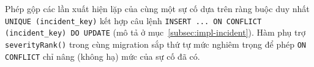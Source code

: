 Phép gộp các lần xuất hiện lặp của cùng một sự cố dựa trên ràng buộc duy nhất
\texttt{UNIQUE (incident\_key)} kết hợp câu lệnh \texttt{INSERT ... ON CONFLICT
(incident\_key) DO UPDATE} (mô tả ở mục~\ref{subsec:impl-incident}). Hàm phụ trợ
\texttt{severityRank()} trong cùng migration sắp thứ tự mức nghiêm trọng để phép
\texttt{ON CONFLICT} chỉ nâng (không hạ) mức của sự cố đã có.
